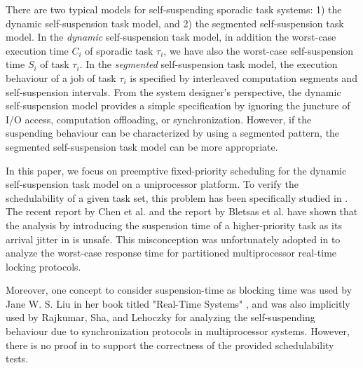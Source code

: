 There are two typical models for self-suspending sporadic task
systems: 1) the dynamic self-suspension task model, and 2) the
segmented self-suspension task model. In the \emph{dynamic}
self-suspension task model, in addition the worst-case execution time
$C_i$ of sporadic task $\tau_i$, we have also the worst-case
self-suspension time $S_i$ of task $\tau_i$. In the \emph{segmented} self-suspension
task model, the execution behaviour of a job of task $\tau_i$ is
specified by interleaved computation segments and self-suspension
intervals.  From the system designer's perspective, the dynamic
self-suspension model provides a simple specification by ignoring the
juncture of I/O access, computation offloading, or
synchronization. However, if the suspending behaviour can be
characterized by using a segmented pattern, the segmented
self-suspension task model can be more appropriate.

In this paper, we focus on preemptive fixed-priority scheduling for
the dynamic self-suspension task model on a uniprocessor platform. To
verify the schedulability of a given task set, this problem has been
specifically studied in
\cite{RTCSA-KimCPKH95,MingLiRTCSA1994,ECRTS-AudsleyB04,RTAS-AudsleyB04,huangpass:dac2015}.
The recent report by Chen et al. and the report by Bletsas et
al. \cite{BletsasReport2015} have shown that the analysis by
introducing the suspension time of a higher-priority task as its
arrival jitter in
\cite{ECRTS-AudsleyB04,RTAS-AudsleyB04,RTCSA-KimCPKH95,MingLiRTCSA1994}
is unsafe.  This misconception was unfortunately adopted in
\cite{zeng-2011,bbb-2013,yang-2013,kim-2014,han-2014,carminati-2014,yang-2014,lakshmanan-2009}
to analyze the worst-case response time for partitioned multiprocessor
real-time locking protocols.

Moreover, one concept to consider suspension-time as blocking time was
used by Jane W. S. Liu in her book titled "Real-Time Systems"
\cite[Pages 164-165]{Liu:2000:RS:518501}, and was also implicitly used
by Rajkumar, Sha, and Lehoczky \cite[Page
267]{DBLP:conf/rtss/RajkumarSL88} for analyzing the self-suspending
behaviour due to synchronization protocols in multiprocessor systems.
However, there is no proof in
\cite{Liu:2000:RS:518501,DBLP:conf/rtss/RajkumarSL88} to support the
correctness of the provided schedulability tests.

